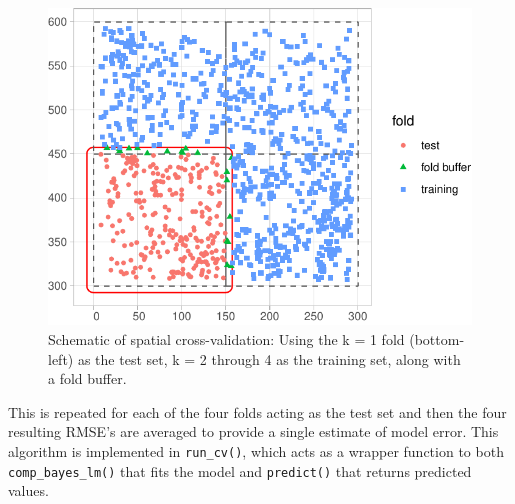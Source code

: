\documentclass[12pt]{article}
\newenvironment{Shaded}{\begin{snugshade}}{\end{snugshade}}
\newcommand{\CommentTok}[1]{\textcolor[rgb]{0.56,0.35,0.01}{\textit{#1}}}
\newcommand{\DataTypeTok}[1]{\textcolor[rgb]{0.13,0.29,0.53}{#1}}
\newcommand{\KeywordTok}[1]{\textcolor[rgb]{0.13,0.29,0.53}{\textbf{#1}}}
\newcommand{\NormalTok}[1]{#1}
\newcommand{\OperatorTok}[1]{\textcolor[rgb]{0.81,0.36,0.00}{\textbf{#1}}}
\newcommand{\StringTok}[1]{\textcolor[rgb]{0.31,0.60,0.02}{#1}}
\begin{document}
\begin{figure}

{\centering \includegraphics[width=0.66\linewidth]{Figures/scbi-spatial-cross-validation-schematic-1} 

}

\caption{Schematic of spatial cross-validation: Using the k = 1 fold (bottom-left) as the test set, k = 2 through 4 as the training set, along with a fold buffer.}\label{fig:scbi-spatial-cross-validation-schematic}
\end{figure}

This is repeated for each of the four folds acting as the test set and
then the four resulting RMSE's are averaged to provide a single estimate
of model error. This algorithm is implemented in \texttt{run\_cv()},
which acts as a wrapper function to both \texttt{comp\_bayes\_lm()} that
fits the model and \texttt{predict()} that returns predicted values.

\begin{Shaded}
\end{Shaded}

\begin{Shaded}
\end{Shaded}
\end{document}
